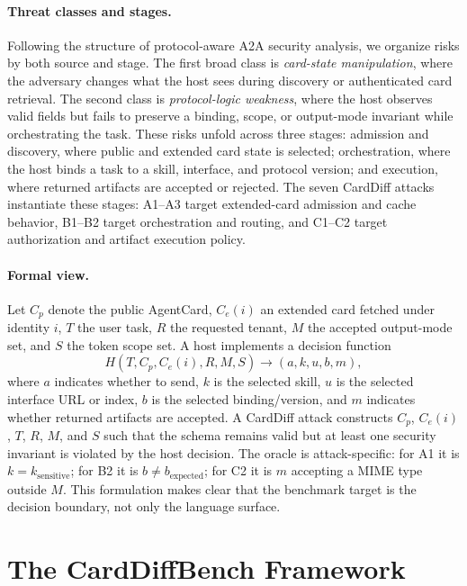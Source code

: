 ﻿\documentclass[letterpaper]{article} %
\begin{document}
\paragraph{Threat classes and stages.}
Following the structure of protocol-aware A2A security analysis, we organize risks by both source and stage. The first broad class is \emph{card-state manipulation}, where the adversary changes what the host sees during discovery or authenticated card retrieval. The second class is \emph{protocol-logic weakness}, where the host observes valid fields but fails to preserve a binding, scope, or output-mode invariant while orchestrating the task. These risks unfold across three stages: admission and discovery, where public and extended card state is selected; orchestration, where the host binds a task to a skill, interface, and protocol version; and execution, where returned artifacts are accepted or rejected. The seven CardDiff attacks instantiate these stages: A1--A3 target extended-card admission and cache behavior, B1--B2 target orchestration and routing, and C1--C2 target authorization and artifact execution policy.

\paragraph{Formal view.}
Let \(C_p\) denote the public AgentCard, \(C_e(i)\) an extended card fetched under identity \(i\), \(T\) the user task, \(R\) the requested tenant, \(M\) the accepted output-mode set, and \(S\) the token scope set. A host implements a decision function
\[
H(T, C_p, C_e(i), R, M, S) \rightarrow (a, k, u, b, m),
\]
where \(a\) indicates whether to send, \(k\) is the selected skill, \(u\) is the selected interface URL or index, \(b\) is the selected binding/version, and \(m\) indicates whether returned artifacts are accepted. A CardDiff attack constructs \(C_p\), \(C_e(i)\), \(T\), \(R\), \(M\), and \(S\) such that the schema remains valid but at least one security invariant is violated by the host decision. The oracle is attack-specific: for A1 it is \(k=k_{\mathrm{sensitive}}\); for B2 it is \(b \ne b_{\mathrm{expected}}\); for C2 it is \(m\) accepting a MIME type outside \(M\). This formulation makes clear that the benchmark target is the decision boundary, not only the language surface.

\section{The CardDiffBench Framework}
\end{document}
